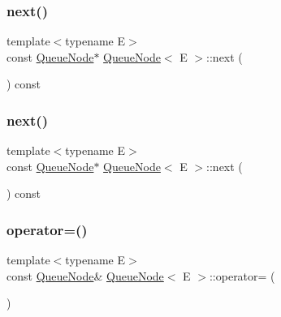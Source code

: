 \mbox{\label{class_queue_node_ada477e4f309f29383112dbda473dd985}} 
\subsubsection{\texorpdfstring{next()}{next()}\hspace{0.1cm}{\footnotesize\ttfamily [5/6]}}
{\footnotesize\ttfamily template$<$typename E$>$ \\
const \mbox{\hyperlink{class_queue_node}{Queue\+Node}}$\ast$ \mbox{\hyperlink{class_queue_node}{Queue\+Node}}$<$ E $>$\+::next (\begin{DoxyParamCaption}{ }\end{DoxyParamCaption}) const\hspace{0.3cm}{\ttfamily [inline]}}

\mbox{\label{class_queue_node_ada477e4f309f29383112dbda473dd985}} 
\subsubsection{\texorpdfstring{next()}{next()}\hspace{0.1cm}{\footnotesize\ttfamily [6/6]}}
{\footnotesize\ttfamily template$<$typename E$>$ \\
const \mbox{\hyperlink{class_queue_node}{Queue\+Node}}$\ast$ \mbox{\hyperlink{class_queue_node}{Queue\+Node}}$<$ E $>$\+::next (\begin{DoxyParamCaption}{ }\end{DoxyParamCaption}) const\hspace{0.3cm}{\ttfamily [inline]}}

\mbox{\label{class_queue_node_a8635bbe6310e011ef4fcf1a01566dbb7}} 
\subsubsection{\texorpdfstring{operator=()}{operator=()}\hspace{0.1cm}{\footnotesize\ttfamily [1/3]}}
{\footnotesize\ttfamily template$<$typename E$>$ \\
const \mbox{\hyperlink{class_queue_node}{Queue\+Node}}\& \mbox{\hyperlink{class_queue_node}{Queue\+Node}}$<$ E $>$\+::operator= (\begin{DoxyParamCaption}\item[{const \mbox{\hyperlink{class_queue_node}{Queue\+Node}}$<$ E $>$ \&}]{ }\end{DoxyParamCaption})\hspace{0.3cm}{\ttfamily [private]}}

